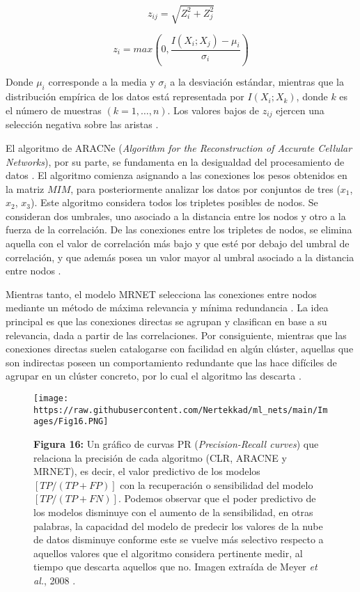 \documentclass[
]{book}
\begin{document}
\[z_{ij}=\sqrt{Z_{i}^{2}+Z_{j}^{2}}\]

\[z_{i}=max(0, \frac{I(X_{i};X_{j})-\mu _{i}}{\sigma _{i}})\]

Donde \(\mu _{i}\) corresponde a la media y \(\sigma _{i}\) a la desviación estándar, mientras que la distribución empírica de los datos está representada por \(I(X_{i};X_{k})\), donde \(k\) es el número de muestras \((k=1,…,n)\). Los valores bajos de \(z_{ij}\) ejercen una selección negativa sobre las aristas \citep{meyer2008minet}.

El algoritmo de ARACNe (\emph{Algorithm for the Reconstruction of Accurate Cellular Networks}), por su parte, se fundamenta en la desigualdad del procesamiento de datos \citep{meyer2008minet}. El algoritmo comienza asignando a las conexiones los pesos obtenidos en la matriz \(MIM\), para posteriormente analizar los datos por conjuntos de tres (\(x_1\), \(x_2\), \(x_3\)). Este algoritmo considera todos los tripletes posibles de nodos. Se consideran dos umbrales, uno asociado a la distancia entre los nodos y otro a la fuerza de la correlación. De las conexiones entre los tripletes de nodos, se elimina aquella con el valor de correlación más bajo y que esté por debajo del umbral de correlación, y que además posea un valor mayor al umbral asociado a la distancia entre nodos \citep{margolin2006aracne}.

Mientras tanto, el modelo MRNET selecciona las conexiones entre nodos mediante un método de máxima relevancia y mínima redundancia \citep{tourassi2001application}. La idea principal es que las conexiones directas se agrupan y clasifican en base a su relevancia, dada a partir de las correlaciones. Por consiguiente, mientras que las conexiones directas suelen catalogarse con facilidad en algún clúster, aquellas que son indirectas poseen un comportamiento redundante que las hace difíciles de agrupar en un clúster concreto, por lo cual el algoritmo las descarta \citep{peng2005feature}.

\begin{figure}
\centering
\texttt{[image: https://raw.githubusercontent.com/Nertekkad/ml\_nets/main/Images/Fig16.PNG]}
\caption{\textbf{Figura 16:} Un gráfico de curvas PR (\emph{Precision-Recall curves}) que relaciona la precisión de cada algoritmo (CLR, ARACNE y MRNET), es decir, el valor predictivo de los modelos \([TP / (TP + FP)]\) con la recuperación o sensibilidad del modelo \([TP / (TP + FN)]\). Podemos observar que el poder predictivo de los modelos disminuye con el aumento de la sensibilidad, en otras palabras, la capacidad del modelo de predecir los valores de la nube de datos disminuye conforme este se vuelve más selectivo respecto a aquellos valores que el algoritmo considera pertinente medir, al tiempo que descarta aquellos que no. Imagen extraída de Meyer \emph{et al.}, 2008 \citep{meyer2008minet}.}
\end{figure}
\end{document}
